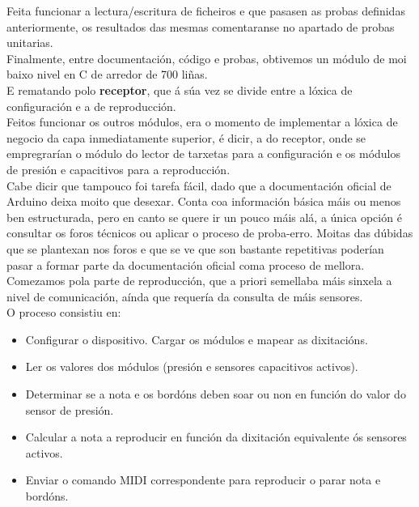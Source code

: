    
   Feita funcionar a lectura/escritura de ficheiros e que pasasen as probas
   definidas anteriormente, os resultados das mesmas comentaranse no apartado de
   probas unitarias. \\
   
   Finalmente, entre documentación, código e probas, obtivemos un módulo de moi
   baixo nivel en C de arredor de 700 liñas. \\
   
   E rematando polo \textbf{receptor}, que á súa vez se divide entre a lóxica
   de configuración e a de reproducción. \\
   
   Feitos funcionar os outros módulos, era o momento de implementar a lóxica de
   negocio da capa inmediatamente superior, é dicir, a do receptor, onde se
   empregrarían o módulo do lector de tarxetas para a configuración e os módulos
   de presión e capacitivos para a reproducción. \\
   
   Cabe dicir que tampouco foi tarefa fácil, dado que a documentación oficial de
   Arduino deixa moito que desexar. Conta coa información básica máis ou menos
   ben estructurada, pero en canto se quere ir un pouco máis alá, a única opción
   é consultar os foros técnicos ou aplicar o proceso de proba-erro. Moitas das
   dúbidas que se plantexan nos foros e que se ve que son bastante repetitivas
   poderían pasar a formar parte da documentación oficial coma proceso de
   mellora. \\
   
   Comezamos pola parte de reproducción, que a priori semellaba máis sinxela a
   nivel de comunicación, aínda que requería da consulta de máis sensores. \\
   
   O proceso consistiu en:
    
   \begin{itemize}
    \item Configurar o dispositivo. Cargar os módulos e mapear as dixitacións.
    \item Ler os valores dos módulos (presión e sensores capacitivos activos).
    \item Determinar se a nota e os bordóns deben soar ou non en función do
        valor do sensor de presión.
    \item Calcular a nota a reproducir en función da dixitación equivalente ós
        sensores activos.
    \item Enviar o comando MIDI correspondente para reproducir o parar nota e
        bordóns.
   \end{itemize}
   
